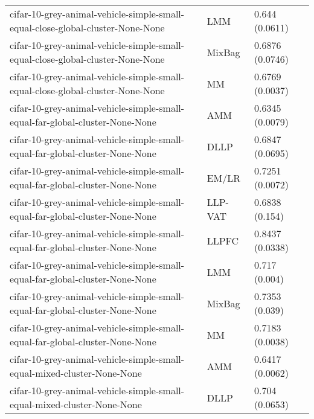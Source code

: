\begin{longtable}{lll}
                               cifar-10-grey-animal-vehicle-simple-small-equal-close-global-cluster-None-None &       LMM &                        0.644 (0.0611) \\
                               cifar-10-grey-animal-vehicle-simple-small-equal-close-global-cluster-None-None &    MixBag &                       0.6876 (0.0746) \\
                               cifar-10-grey-animal-vehicle-simple-small-equal-close-global-cluster-None-None &        MM &                       0.6769 (0.0037) \\
                                 cifar-10-grey-animal-vehicle-simple-small-equal-far-global-cluster-None-None &       AMM &                       0.6345 (0.0079) \\
                                 cifar-10-grey-animal-vehicle-simple-small-equal-far-global-cluster-None-None &      DLLP &                       0.6847 (0.0695) \\
                                 cifar-10-grey-animal-vehicle-simple-small-equal-far-global-cluster-None-None &     EM/LR &                       0.7251 (0.0072) \\
                                 cifar-10-grey-animal-vehicle-simple-small-equal-far-global-cluster-None-None &   LLP-VAT &                        0.6838 (0.154) \\
                                 cifar-10-grey-animal-vehicle-simple-small-equal-far-global-cluster-None-None &     LLPFC &                       0.8437 (0.0338) \\
                                 cifar-10-grey-animal-vehicle-simple-small-equal-far-global-cluster-None-None &       LMM &                         0.717 (0.004) \\
                                 cifar-10-grey-animal-vehicle-simple-small-equal-far-global-cluster-None-None &    MixBag &                        0.7353 (0.039) \\
                                 cifar-10-grey-animal-vehicle-simple-small-equal-far-global-cluster-None-None &        MM &                       0.7183 (0.0038) \\
                                      cifar-10-grey-animal-vehicle-simple-small-equal-mixed-cluster-None-None &       AMM &                       0.6417 (0.0062) \\
                                      cifar-10-grey-animal-vehicle-simple-small-equal-mixed-cluster-None-None &      DLLP &                        0.704 (0.0653) \\

\end{longtable}
